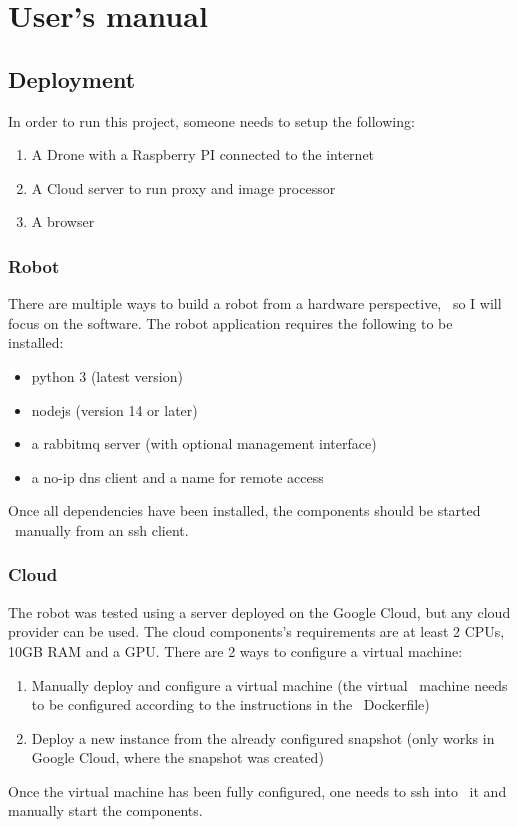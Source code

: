 

\chapter{User's manual}
\label{ch:user-manual}

\section{Deployment}
\label{sec:user-manual-deployment}

In order to run this project, someone needs to setup the following:
\begin{enumerate}
    \item A Drone with a Raspberry PI connected to the internet
    \item A Cloud server to run proxy and image processor
    \item A browser
\end{enumerate}

\subsection{Robot}
\label{subsec:user-manual-robot}
There are multiple ways to build a robot from a hardware perspective, \
so I will focus on the software.
The robot application requires the following to be installed:
\begin{itemize}
    \item python 3 (latest version)
    \item nodejs (version 14 or later)
    \item a rabbitmq server (with optional management interface)
    \item a no-ip dns client and a name for remote access
\end{itemize}
Once all dependencies have been installed, the components should be started \
manually from an ssh client.

\subsection{Cloud}
\label{subsec:user-manual-cloud}
The robot was tested using a server deployed on the Google Cloud,
but any cloud provider can be used.
The cloud components's requirements are at least 2 CPUs, 10GB RAM and
a GPU.
There are 2 ways to configure a virtual machine:
\begin{enumerate}
    \item Manually deploy and configure a virtual machine (the virtual \
        machine needs to be configured according to the instructions in the \
        Dockerfile)
    \item Deploy a new instance from the already configured snapshot
        (only works in Google Cloud, where the snapshot was created)
\end{enumerate}
Once the virtual machine has been fully configured, one needs to ssh into \
it and manually start the components.

